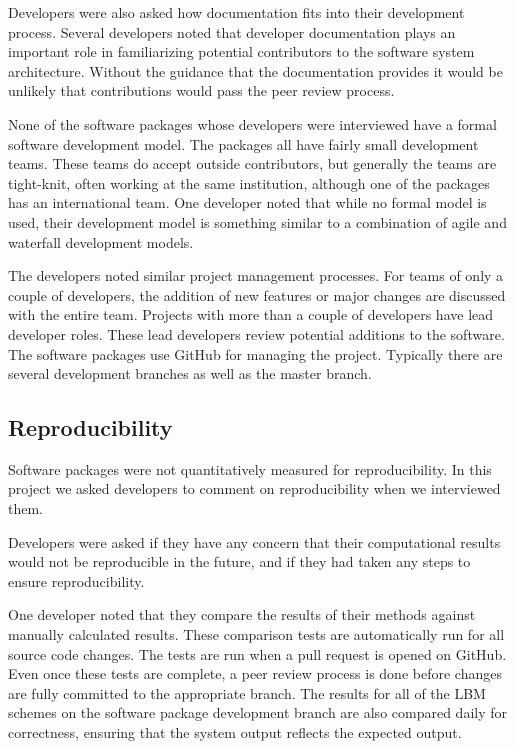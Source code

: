 \documentclass[12pt, notitlepage]{article}
\begin{document}
Developers were also asked how documentation fits into their development process. Several developers noted that developer documentation plays an important role in familiarizing potential contributors to the software system architecture. Without the guidance that the documentation provides it would be unlikely that contributions would pass the peer review process. 

None of the software packages whose developers were interviewed have a formal software development model. The packages all have fairly small development teams. These teams do accept outside contributors, but generally the teams are tight-knit, often working at the same institution, although one of the packages has an international team. One developer noted that while no formal model is used, their development model is something similar to a combination of agile and waterfall development models. 

The developers noted similar project management processes. For teams of only a couple of developers, the addition of new features or major changes are discussed with the entire team. Projects with more than a couple of developers have lead developer roles. These lead developers review potential additions to the software. The software packages use GitHub for managing the project. Typically there are several development branches as well as the master branch.

\subsection{Reproducibility}

Software packages were not quantitatively measured for reproducibility.
In this project we asked developers to comment on reproducibility when we interviewed them.

Developers were asked if they have any concern that their computational results would not be reproducible in the future, and if they had taken any steps to ensure reproducibility.

One developer noted that they compare the results of their methods against manually calculated results. These comparison tests are automatically run for all source code changes. The tests are run when a pull request is opened on GitHub. Even once these tests are complete, a peer review process is done before changes are fully committed to the appropriate branch. The results for all of the LBM schemes on the software package development branch are also compared daily for correctness, ensuring that the system output reflects the expected output.  
\end{document}
